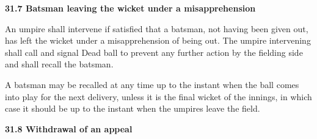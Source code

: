 \documentclass[12pt]{article}
\begin{document}
\vspace{\baselineskip}
{\fontsize{11pt}{13.2pt}\selectfont \textbf{31.7 \tabto{0.47in} Batsman leaving the wicket under a misapprehension}\par}\par


\vspace{\baselineskip}
\begin{adjustwidth}{0.0in}{0.07in}
{\fontsize{9pt}{10.8pt}\selectfont An umpire shall intervene if satisfied that a batsman, not having been given out, has left the wicket under a misapprehension of being out. The umpire intervening shall call and signal Dead ball to prevent any further action by the fielding side and shall recall the batsman.\par}\par

\end{adjustwidth}


\vspace{\baselineskip}
\begin{adjustwidth}{0.0in}{0.08in}
{\fontsize{9pt}{10.8pt}\selectfont A batsman may be recalled at any time up to the instant when the ball comes into play for the next delivery, unless it is the final wicket of the innings, in which case it should be up to the instant when the umpires leave the field.\par}\par

\end{adjustwidth}


\vspace{\baselineskip}

\vspace{\baselineskip}

\vspace{\baselineskip}

\vspace{\baselineskip}

\vspace{\baselineskip}

\vspace{\baselineskip}

\vspace{\baselineskip}
\begin{Center}
{\fontsize{8pt}{9.6pt}\par}
\end{Center}\par


\vspace{\baselineskip}
{\fontsize{11pt}{13.2pt}\selectfont \textbf{31.8 \tabto{0.47in} Withdrawal of an appeal}\par}\par
\end{document}
